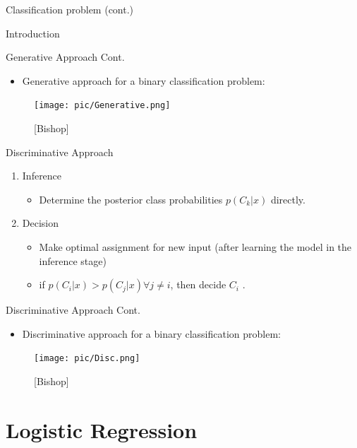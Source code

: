\documentclass[serif, aspectratio=169]{beamer}
\begin{document}
\begin{frame}{Classification problem (cont.)}
\begin{itemize}
\begin{frame}{Introduction}
\begin{itemize}
\begin{frame}{Generative Approach Cont.}
    \begin{itemize}
        \item Generative approach for a binary classification problem:
    \end{itemize}
    \begin{figure}[h]
      \centering
      \texttt{[image: pic/Generative.png]}
      \caption*{\footnotesize [Bishop]}
      \end{figure}
\end{frame}
\begin{frame}{Discriminative Approach}
    \begin{enumerate}
        \item Inference
        \begin{itemize}
            \item Determine the posterior class probabilities $p(C_k|x)$ directly.
        \end{itemize}
        \item Decision
        \begin{itemize}
            \item Make optimal assignment for new input (after learning the model in the inference stage)
            \item if $p(C_i|x) > p(C_j|x) \forall j \neq i$, then decide $C_i$ .
        \end{itemize}
    \end{enumerate}
\end{frame}
\begin{frame}{Discriminative Approach Cont.}
    \begin{itemize}
        \item Discriminative approach for a binary classification problem:
    \end{itemize}
    \begin{figure}[h]
      \centering
      \texttt{[image: pic/Disc.png]}
      \caption*{\footnotesize [Bishop]}
      \end{figure}
\end{frame}


\section{Logistic Regression}


\end{itemize}
\end{frame}
\end{itemize}
\end{frame}
\end{document}
